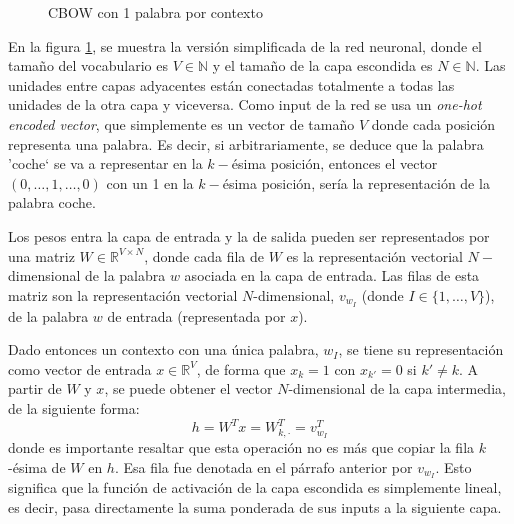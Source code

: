 \begin{figure}[h]
\begin{tikzpicture}[
          roundnode/.style={circle, draw=black, minimum size=4mm},
      ]
  \end{tikzpicture}
  \caption{CBOW con 1 palabra por contexto}
  \label{redneuronal:3}
\end{figure}

En la figura \ref{redneuronal:3}, se muestra la versión simplificada de la red neuronal, donde el tamaño del vocabulario es $V\in\mathbb{N}$ y el tamaño de la capa escondida es $N\in\mathbb{N}$.
Las unidades entre capas adyacentes están conectadas totalmente a todas las unidades de la otra capa y viceversa. Como input de la red se usa un \textit{one-hot encoded vector},
que simplemente es un vector de tamaño $V$ donde cada posición representa una palabra. Es decir, si arbitrariamente, se deduce que la palabra 'coche` se va a representar en la $k-$ésima
posición, entonces el vector $(0, \dots, 1, \dots, 0)$ con un 1 en la $k-$ésima posición, sería la representación de la palabra coche.

Los pesos entra la capa de entrada y la de salida pueden ser representados por una matriz $W\in\mathbb{R}^{V\times N}$, donde cada fila de $W$ es la representación
vectorial $N-$dimensional de la palabra $w$ asociada en la capa de entrada. Las filas de esta matriz son la representación vectorial $N$-dimensional, $v_{w_I}$ (donde $I\in\{1, \ldots, V\}$),
de la palabra $w$ de entrada (representada por $x$).

Dado entonces un contexto con una única palabra, $w_I$, se tiene su representación como vector de entrada $x\in\mathbb{R}^V$, de forma que $x_k=1$ con $x_{k'}=0$ si $k'\neq k$. A partir de
$W$ y $x$, se puede obtener el vector $N$-dimensional de la capa intermedia, de la siguiente forma:
\begin{equation}\label{eq:h}
  h=W^Tx=W^T_{k, \cdot}=v^T_{w_I}
\end{equation}
donde es importante resaltar que esta operación no es más que copiar la fila $k$-ésima de $W$ en $h$. Esa fila fue denotada en el párrafo anterior por $v_{w_I}$.
Esto significa que la función de activación de la capa escondida es simplemente lineal, es decir, pasa directamente la suma ponderada de sus inputs a la siguiente capa.

